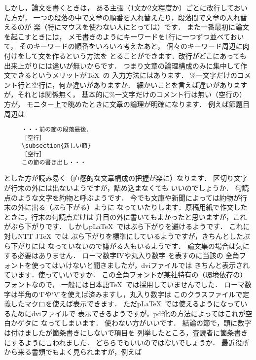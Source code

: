 \documentclass[dvipdfmx,onecolumn]{jsce}  %
\begin{document}
\begin{Enumerate}
しかし，論文を書くときは，
ある主張（1文か2文程度か）ごとに改行しておいた方が，
一つの段落の中で文章の順番を入れ替えたり，段落間で文章の入れ替えるのが
楽（特にマウスを使わない人にとっては）です．
また一番最初に論文を起こすときには，
メモ書きのようにキーワードを1行に一つずつ並べておいて，
そのキーワードの順番をいろいろ考えたあと，
個々のキーワード周辺に肉付けをして文を作るという方法を
とることができます．改行がどこにあっても出来上がりには違いが無いからです．
つまり文章の論理構成のみに集中して作文できるというメリットが\TeX\ の
入力方法にはあります．
%
\Qitem \%一文字だけのコメント行と空行に，何か違いがありますか．
\Aitem 細かいことを言えば違いがありますが，それとは関係無く，
基本的に\%一文字だけのコメント行は無い（空行の）方が，
モニター上で眺めたときに文章の論理が明確になります．
例えば節題目周辺は

\renewcommand{\baselinestretch}{.74}
\begin{verbatim}
     ・・・前の節の段落最後．
     ［空行］
     \subsection{新しい節}
     ［空行］
     この節の書き出し・・・
\end{verbatim}
\renewcommand{\baselinestretch}{1}
とした方が読み易く（直感的な文章構成の把握が楽に）なります．
%
\Qitem 区切り文字が行末の外には出ないようですが，詰め込まなくても
いいのでしょうか．
\Aitem 句読点のような文字を約物と呼ぶようです．
今でも文庫や新聞によっては約物が行末の外に出る（ぶら下がる）ように
なっていたりします．原稿用紙で作文したときに，行末の句読点だけは
升目の外に書いてもよかったと思いますが，これがぶら下がりです．
しかしp\LaTeX\ ではぶら下がりを避けるようです．
これに対しNTT J\TeX\ では
ぶら下がりを標準にしているようですが，きちんとしたぶら下がりには
なっていないので嫌がる人もいるようです．
論文集の場合は気にする必要はありません．
%
\Qitem ローマ数字IVや丸入り数字\,\,を表すのに当該の
全角フォントを使ってはいけないと聞きましたが，dviファイルでは
きちんと表示されています．使っていいですか．
\Aitem この全角フォントが某社特有の（環境依存の）フォントなので，
一般には日本語\TeX\ では採用していませんでした．
ローマ数字は半角の`I'や`V'を使えば済みますし，丸入り数字は
このクラスファイルで定義したマクロを使えば表示できます．
ただp\LaTeX\ では使えるようになっているためにdviファイルで
表示できるようですが，pdf化の方法によってはこれが空白かゲタに
なってしまいます．
使わない方がいいです．
%
\Qitem 結論の節で，頭に数字は付けましたが箇条書きにしないで項目を
列挙したところ，査読者に箇条書きにするように言われました．
どちらでもいいのではないでしょうか．
\Aitem 最近役所から来る書類でもよく見られますが，例えば


\end{Enumerate}
\end{document}
